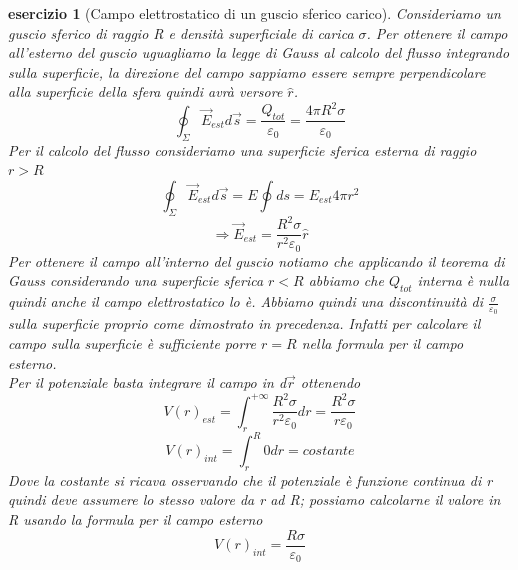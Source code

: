 \documentclass[10pt,a4paper]{article}
\newtheorem{esercizio}{esercizio}
\begin{document}
\begin{esercizio}[Campo elettrostatico di un guscio sferico carico]
Consideriamo un guscio sferico di raggio R e densità superficiale di carica $\sigma$. Per ottenere il campo all'esterno del guscio uguagliamo la legge di Gauss al calcolo del flusso integrando sulla superficie, la direzione del campo sappiamo essere sempre perpendicolare alla superficie della sfera quindi avrà versore $\hat{r}$.
\[\oint_{\Sigma}\vec{E}_{est}d\vec{s} = \frac{Q_{tot}}{\varepsilon_0} = \frac{4\pi R^2 \sigma}{\varepsilon_0}\]
Per il calcolo del flusso consideriamo una superficie sferica esterna di raggio \(r>R\)
\[\oint_{\Sigma}\vec{E}_{est}d\vec{s} = E\oint ds = E_{est} 4\pi r^2\]
\[\Rightarrow \vec{E}_{est} = \frac{R^2 \sigma}{r^2 \varepsilon_0} \hat{r}\]
Per ottenere il campo all'interno del guscio notiamo che applicando il teorema di Gauss considerando una superficie sferica \(r<R\) abbiamo che \(Q_{tot}\) interna è nulla quindi anche il campo elettrostatico lo è. Abbiamo quindi una discontinuità di $\frac{\sigma}{\varepsilon_0}$ sulla superficie proprio come dimostrato in precedenza. Infatti per calcolare il campo sulla superficie è sufficiente porre \(r=R\) nella formula per il campo esterno.\\
Per il potenziale basta integrare il campo in d$\vec{r}$ ottenendo
\[V(r)_{est} = \int_{r}^{+\infty} \frac{R^2 \sigma}{r^2 \varepsilon_0} dr = \frac{R^2 \sigma}{ r\varepsilon_0}\]
\[V(r)_{int} = \int^{R}_r 0 dr = costante \]
Dove la costante si ricava osservando che il potenziale è funzione continua di r quindi deve assumere lo stesso valore da r ad R; possiamo calcolarne il valore in R usando la formula per il campo esterno
\[V(r)_{int} = \frac{R \sigma}{\varepsilon_0}\]
\end{esercizio}
\end{document}
